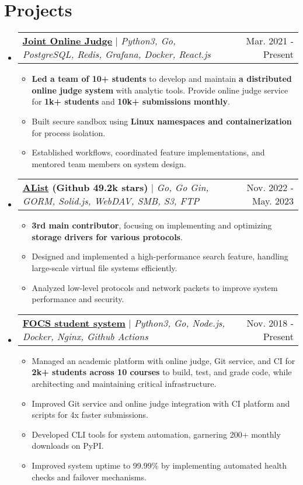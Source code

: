 \documentclass[letterpaper,11pt]{article}
\makeatletter
\newcommand{\resumeItem}[1]{
  \item\small{
    {#1 \vspace{-2pt}}
  }
}
\newcommand{\resumeProjectHeader}[2]{
    \item
    \begin{tabular*}{0.98\textwidth}{l@{\extracolsep{\fill}}r}
      \small#1 & #2 \\
    \end{tabular*}\vspace{-7pt}
}
\newcommand{\resumeSubHeaderListStart}{\begin{itemize}[leftmargin=0.15in, label={}]}
\newcommand{\resumeSubHeaderListEnd}{\end{itemize}}
\newcommand{\resumeItemListStart}{\begin{itemize}}
\newcommand{\resumeItemListEnd}{\end{itemize}\vspace{-5pt}}
\makeatother
\begin{document}
\section{Projects}
    \resumeSubHeaderListStart
      \resumeProjectHeader
        {\href{https://github.com/joint-online-judge}{\textbf{Joint Online Judge}} $|$ \emph{Python3, Go, PostgreSQL, Redis, Grafana, Docker, React.js}}{Mar. 2021 - Present}
        \resumeItemListStart
          \resumeItem{\textbf{Led a team of 10+ students} to develop and maintain \textbf{a distributed online judge system} with analytic tools. Provide online judge service for \textbf{1k+ students} and \textbf{10k+ submissions monthly}.}
          \resumeItem{Built secure sandbox using \textbf{Linux namespaces and containerization} for process isolation.}
          \resumeItem{Established workflows, coordinated feature implementations, and mentored team members on system design.}
        \resumeItemListEnd
      \resumeProjectHeader
        {\textbf{\href{https://github.com/AlistGo/alist}{AList} (Github 49.2k stars)} $|$ \emph{Go, Go Gin, GORM, Solid.js, WebDAV, SMB, S3, FTP}}{Nov. 2022 - May. 2023}
        \resumeItemListStart
          \resumeItem{\textbf{3rd main contributor}, focusing on implementing and optimizing \textbf{storage drivers for various protocols}.}
          \resumeItem{Designed and implemented a high-performance search feature, handling large-scale virtual file systems efficiently.}
          \resumeItem{Analyzed low-level protocols and network packets to improve system performance and security.}
        \resumeItemListEnd
      \resumeProjectHeader
        {\href{https://gist.github.com/BoYanZh/fc4469c20fd6adf42c212114532aaac0}{\textbf{FOCS student system}} $|$ \emph{Python3, Go, Node.js, Docker, Nginx, Github Actions}}{Nov. 2018 - Present}
        \resumeItemListStart
          \resumeItem{Managed an academic platform with online judge, Git service, and CI for \textbf{2k+ students across 10 courses} to build, test, and grade code, while architecting and maintaining critical infrastructure.}
          \resumeItem{Improved Git service and online judge integration with CI platform and scripts for 4x faster submissions.}
          \resumeItem{Developed CLI tools for system automation, garnering 200+ monthly downloads on PyPI.}
          \resumeItem{Improved system uptime to 99.99\% by implementing automated health checks and failover mechanisms.}
        \resumeItemListEnd
    \resumeSubHeaderListEnd
\end{document}
